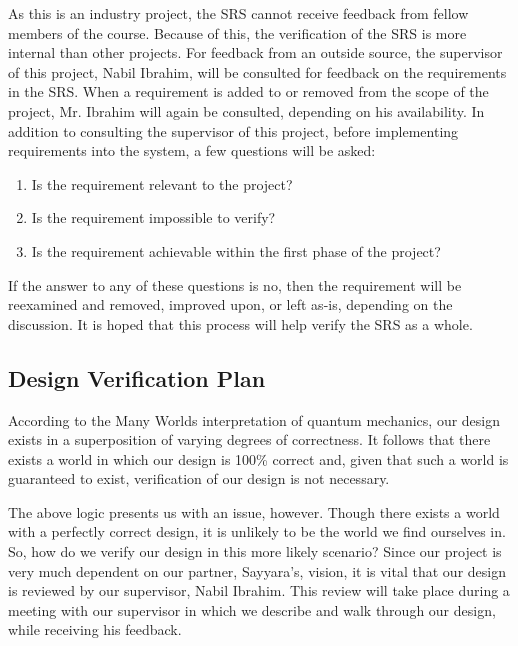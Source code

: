 \documentclass[12pt, titlepage]{article}
\begin{document}
As this is an industry project, the SRS cannot receive feedback from fellow members of the course. Because of this, the verification of the SRS is more internal than other projects. For feedback from an outside source, the supervisor of this project, Nabil Ibrahim, will be consulted for feedback on the requirements in the SRS. When a requirement is added to or removed from the scope of the project, Mr. Ibrahim will again be consulted, depending on his availability. In addition to consulting the supervisor of this project, before implementing requirements into the system, a few questions will be asked:
\begin{enumerate}
    \item Is the requirement relevant to the project?
    \item Is the requirement impossible to verify?
    \item Is the requirement achievable within the first phase of the project?
\end{enumerate}

\noindent If the answer to any of these questions is no, then the requirement will be reexamined and removed, improved upon, or left as-is, depending on the discussion. It is hoped that this process will help verify the SRS as a whole.


\subsection{Design Verification Plan}

According to the Many Worlds interpretation of quantum mechanics, our design exists in a superposition of varying degrees of correctness. It follows that there exists a world in which our design is 100\% correct and, given that such a world is guaranteed to exist, verification of our design is not necessary.

The above logic presents us with an issue, however. Though there exists a world with a perfectly correct design, it is unlikely to be the world we find ourselves in. So, how do we verify our design in this more likely scenario? Since our project is very much dependent on our partner, Sayyara's, vision, it is vital that our design is reviewed by our supervisor, Nabil Ibrahim. This review will take place during a meeting with our supervisor in which we describe and walk through our design, while receiving his feedback.
\end{document}

